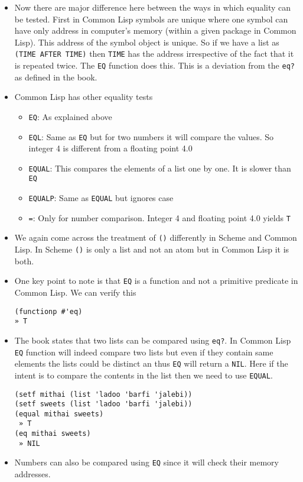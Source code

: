 \documentclass[11pt]{article}
\begin{document}
\begin{itemize}
\item Now there are major difference here between the ways in which equality can be tested. First in Common Lisp symbols
are unique where one symbol can have only address in computer's memory (within a given package in Common Lisp).
This address of the symbol object is unique. So if we have a list as \texttt{(TIME AFTER TIME)} then \texttt{TIME} has the address
irrespective of the fact that it is repeated twice. The \texttt{EQ} function does this. This is a deviation from the
\texttt{eq?} as defined in the book.
\item Common Lisp has other equality tests
\begin{itemize}
\item \texttt{EQ}: As explained above
\item \texttt{EQL}: Same as \texttt{EQ} but for two numbers it will compare the values. So integer 4 is different from a floating
point 4.0
\item \texttt{EQUAL}: This compares the elements of a list one by one. It is slower than \texttt{EQ}
\item \texttt{EQUALP}: Same as \texttt{EQUAL} but ignores case
\item \texttt{=}: Only for number comparison. Integer 4 and floating point 4.0 yields \texttt{T}
\end{itemize}
\item We again come across the treatment of \texttt{()} differently in Scheme and Common Lisp. In Scheme \texttt{()} is only a list and
not an atom but in Common Lisp it is both.
\item One key point to note is that \texttt{EQ} is a function and not a primitive predicate in Common Lisp. We can verify this
\begin{verbatim}
(functionp #'eq)
» T
\end{verbatim}
\item The book states that two lists can be compared using \texttt{eq?}. In Common Lisp \texttt{EQ} function will indeed compare two
lists but even if they contain same elements the lists could be distinct an thus \texttt{EQ} will return a \texttt{NIL}. Here if
the intent is to compare the contents in the list then we need to use \texttt{EQUAL}.
\begin{verbatim}
(setf mithai (list 'ladoo 'barfi 'jalebi))
(setf sweets (list 'ladoo 'barfi 'jalebi))
(equal mithai sweets)
 » T
(eq mithai sweets)
 » NIL
\end{verbatim}
\item Numbers can also be compared using \texttt{EQ} since it will check their memory addresses.
\end{itemize}
\end{document}
